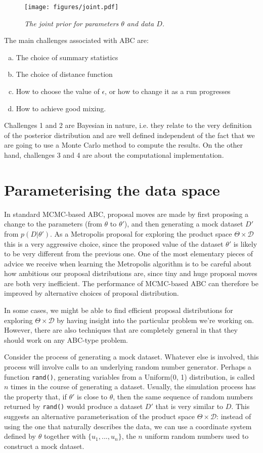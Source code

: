 \documentclass[article]{jss}
\newcommand{\params}{\theta}
\newcommand{\data}{D}
\begin{document}
\begin{figure}[ht!]
\centering
\texttt{[image: figures/joint.pdf]}
\caption{\it The joint prior for parameters $\params$ and data $\data$.
\label{fig:joint}}
\end{figure}

The main challenges associated with ABC are:
\begin{enumerate}[(a)]
\item The choice of summary statistics
\item The choice of distance function
\item How to choose the value of $\epsilon$, or how to change it as a run
progresses
\item How to achieve good mixing.
\end{enumerate}
Challenges 1 and 2 are Bayesian in nature, i.e. they relate to the very
definition of the posterior distribution and are well defined independent of
the fact that we are going to use a Monte Carlo method to compute the
results. On the other hand, challenges 3 and 4 are about the computational implementation.

\section{Parameterising the data space}
In standard MCMC-based ABC, proposal moves are made by first proposing a
change to the parameters (from $\params$ to $\params'$), and then generating
a mock dataset $\data'$ from $p(\data | \params')$. As a Metropolis proposal
for exploring the product space $\Theta \times \mathcal{D}$ this is a very
aggressive choice, since the proposed value of the
dataset $\params'$ is likely to be very different from the previous one.
One of the most elementary pieces of advice we receive when learning the
Metropolis algorithm is to be careful about how ambitious our proposal
distributions are, since tiny and huge proposal moves are both very
inefficient. The performance of MCMC-based ABC can therefore be improved by
alternative choices of proposal distribution.

In some cases, we might be able to find efficient proposal distributions for exploring $\Theta \times \mathcal{D}$ by having insight into the particular
problem we're working on. However, there are also techniques that are
completely general in that they should work on any ABC-type problem.

Consider the process of generating a mock dataset. Whatever else is involved,
this process will involve calls to an underlying random number generator.
Perhaps a function {\tt rand()}, generating variables from a Uniform(0, 1)
distribution, is called $n$ times in the course of generating a dataset.
Usually, the simulation process has the property that, if $\theta'$ is
close to $\theta$, then the same sequence of random numbers returned by
{\tt rand()} would produce a dataset $\data'$ that is very similar to $\data$.
This suggests an alternative parameterisation of
the product space $\Theta\times\mathcal{D}$: instead of using the one that
naturally describes the data, we can use a coordinate system defined by
$\theta$ together with $\{u_1, ..., u_n\}$, the $n$ uniform random numbers
used to construct a mock dataset.
\end{document}
